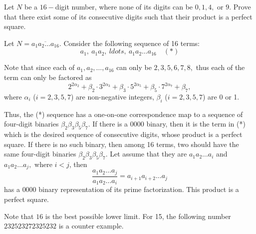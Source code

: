 \documentclass{article}
\begin{document}
\begin{example*}[Example 20]
    Let $N$ be a $16-$digit number, where none of its digits can be $0, 1, 4,$ or $9.$
    Prove that there exist some of its consecutive digits such that their product is a perfect square.
\end{example*}

\begin{soln}
    Let $N = \overline{a_1a_2 \ldots a_{16}}.$ Consider the following sequence of 16 terms:
    \[
        a_1,\ a_1a_2,\ ldots,\ a_1a_2 \ldots a_{16} \quad (*)
    \]

    Note that since each of $a_1, a_2, \ldots, a_{16}$ can only be $2,3,5,6,7,8,$ thus each of the term can only be factored as
    \[
        2^{2\alpha_2}+\beta_2 \cdot 3^{2\alpha_3}+\beta_3 \cdot 5^{2\alpha_5}+\beta_5 \cdot 7^{2\alpha_7}+\beta_7,
    \]
    where $\alpha_i$ ($i=2,3,5,7$) are non-negative integers, $\beta_i$ ($i=2,3,5,7$) are 0 or 1.

    Thus, the (*) sequence has a one-on-one correspondence map to a sequence of four-digit binaries $\beta_2 \beta_3 \beta_5 \beta_7.$
    If there is a $0000$ binary, then it is the term in (*) which is the desired sequence of consecutive digits, whose product is a perfect square.
    If there is no such binary, then among 16 terms, two should have the same four-digit binaries $\beta_2 \beta_3 \beta_5 \beta_7.$
    Let assume that they are $a_1a_2 \ldots a_{i}$ and $a_1a_2 \ldots a_{j},$ where $i<j$, then
    \[
        \frac{a_1a_2 \ldots a_{j}}{a_1a_2 \ldots a_{i}} = a_{i+1}a_{i+2} \ldots a_{j}
    \]
    has a $0000$ binary representation of its prime factorization. This product is a perfect square.

    Note that $16$ is the best possible lower limit. For 15, the following number $232523272325232$ is a counter example.
\end{soln}
\end{document}
